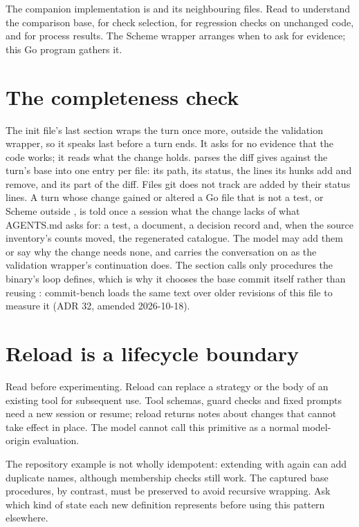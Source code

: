The companion implementation is  and its
neighbouring files. Read  to understand the
comparison base,  for check selection,
 for regression checks on unchanged code,
and  for process results. The Scheme
wrapper arranges when to ask for evidence; this Go program gathers it.

\section{The completeness check}

The init file's last section wraps the turn once more, outside the
validation wrapper, so it speaks last before a turn ends. It asks for no
evidence that the code works; it reads what the change holds.
 parses the diff  gives against the
turn's base into one entry per file: its path, its status, the lines its
hunks add and remove, and its part of the diff. Files git does not track are
added by their status lines. A turn whose change gained or altered a Go file
that is not a test, or Scheme outside , is told once a session
what the change lacks of what AGENTS.md asks for: a test, a document, a
decision record and, when the source inventory's counts moved, the
regenerated catalogue. The model may add them or say why the change needs
none, and  carries the conversation on as the
validation wrapper's continuation does. The section calls only procedures the
binary's loop defines, which is why it chooses the base commit itself rather
than reusing : commit-bench loads the same text over
older revisions of this file to measure it (ADR 32, amended 2026-10-18).

\section{Reload is a lifecycle boundary}

Read  before experimenting. Reload can
replace a strategy or the body of an existing tool for subsequent use.
Tool schemas, guard checks and fixed prompts need a new session or resume;
reload returns notes about changes that cannot take effect in place.
The model cannot call this primitive as a normal model-origin evaluation.

The repository example is not wholly idempotent: extending
 with  again can add duplicate names, although
membership checks still work. The captured base procedures, by contrast,
must be preserved to avoid recursive wrapping. Ask which kind of state
each new definition represents before using this pattern elsewhere.

